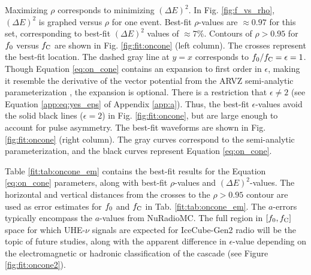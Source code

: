 \documentclass[amsmath,amssymb,aps,prd,10pt,twocolumn]{revtex4}
\begin{document}
Maximizing $\rho$ corresponds to minimizing $(\Delta E)^2$.  In Fig. \ref{fig:f_vs_rho}, $(\Delta E)^2$ is graphed versus $\rho$ for one event.  Best-fit $\rho$-values are $\approx 0.97$ for this set, corresponding to best-fit $(\Delta E)^2$ values of $\approx 7\%$.  Contours of $\rho>0.95$ for $f_{\rm 0}$ versus $f_{\rm C}$ are shown in Fig. \ref{fig:fit:oncone} (left column). The crosses represent the best-fit location.  The dashed gray line at $y=x$ corresponds to $f_{\rm 0}/f_{\rm C} = \epsilon = 1$.  Though Equation \ref{eq:on_cone} contains an expansion to first order in $\epsilon$, making it resemble the derivative of the vector potential from the ARVZ semi-analytic parameterization \cite{PhysRevD.101.083005}, the expansion is optional.  There is a restriction that $\epsilon \neq 2$ (see Equation \ref{app:eq:yes_eps} of Appendix \ref{app:a}).  Thus, the best-fit $\epsilon$-values avoid the solid black lines ($\epsilon = 2$) in Fig. \ref{fig:fit:oncone}, but are large enough to account for pulse asymmetry.  The best-fit waveforms are shown in Fig. \ref{fig:fit:oncone} (right column).  The gray curves correspond to the semi-analytic parameterization, and the black curves represent Equation \ref{eq:on_cone}.

Table \ref{fit:tab:oncone_em} contains the best-fit results for the Equation \ref{eq:on_cone} parameters, along with best-fit $\rho$-values and $(\Delta E)^2$-values.  The horizontal and vertical distances from the crosses to the $\rho > 0.95$ contour are used as error estimates for $f_{\rm 0}$ and $f_{\rm C}$ in Tab. \ref{fit:tab:oncone_em}.  The $a$-errors typically encompass the $a$-values from NuRadioMC.  The full region in $[f_{\rm 0},f_{\rm C}]$ space for which UHE-$\nu$ signals are expected for IceCube-Gen2 radio will be the topic of future studies, along with the apparent difference in $\epsilon$-value depending on the electromagnetic or hadronic classification of the cascade (see Figure \ref{fig:fit:oncone2}).
\end{document}
